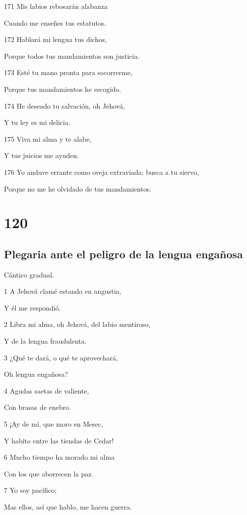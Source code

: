 \par 171 Mis labios rebosarán alabanza
\par Cuando me enseñes tus estatutos.
\par 172 Hablará mi lengua tus dichos,
\par Porque todos tus mandamientos son justicia.
\par 173 Esté tu mano pronta para socorrerme,
\par Porque tus mandamientos he escogido.
\par 174 He deseado tu salvación, oh Jehová,
\par Y tu ley es mi delicia.
\par 175 Viva mi alma y te alabe,
\par Y tus juicios me ayuden.
\par 176 Yo anduve errante como oveja extraviada; busca a tu siervo,
\par Porque no me he olvidado de tus mandamientos.

\chapter{120}

\section*{Plegaria ante el peligro de la lengua engañosa}

\par Cántico gradual.

\par 1 A Jehová clamé estando en angustia,
\par Y él me respondió.
\par 2 Libra mi alma, oh Jehová, del labio mentiroso,
\par Y de la lengua fraudulenta.
\par 3 ¿Qué te dará, o qué te aprovechará,
\par Oh lengua engañosa?
\par 4 Agudas saetas de valiente,
\par Con brasas de enebro.
\par 5 ¡Ay de mí, que moro en Mesec,
\par Y habito entre las tiendas de Cedar!
\par 6 Mucho tiempo ha morado mi alma
\par Con los que aborrecen la paz.
\par 7 Yo soy pacífico;
\par Mas ellos, así que hablo, me hacen guerra.

